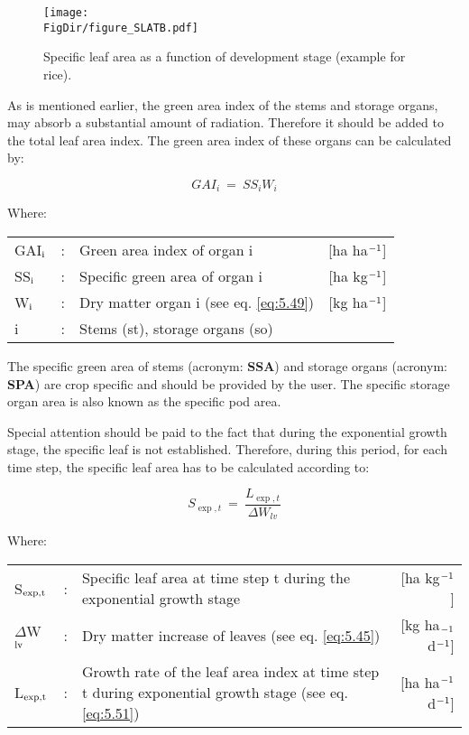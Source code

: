 \begin{figure}[p]
	\centering
	\texttt{[image: \\FigDir/figure\_SLATB.pdf]}
	\caption{Specific leaf area as a function of development stage (example for rice).}
	\label{fig:SpecificLeafArea}
\end{figure}

As is mentioned earlier, the green area index of the stems and storage organs, may absorb
a substantial amount of radiation. Therefore it should be added to the total leaf area
index. The green area index of these organs can be calculated by:

\begin{equation}
GAI_{i} ~=~SS _{i} W _{i} 
\end{equation}

Where:\\[5pt]
\begin{tabularx}{\textwidth}{llXr}
	GAI$_{{\rm i}}$ &:& Green area index of organ i    &
	[ha ha$^{{\rm -1}}$]\\
	SS$_{{\rm i}}$ &:& Specific green area of organ i    &
	[ha kg$^{{\rm -1}}$]\\
	W$_{{\rm i}}$ &:& Dry matter organ i (see eq. \ref{eq:5.49})    &
	[kg ha$^{{\rm -1}}$]\\
	i &:& Stems (st), storage organs (so)
\end{tabularx}

The specific green area of stems (acronym: {\bf SSA}) and storage organs (acronym: {\bf SPA}) are
crop specific and should be provided by the user. The specific storage organ area is also
known as the specific pod area.

Special attention should be paid to the fact that during the exponential growth stage, the
specific leaf is not established. Therefore, during this period, for each time step, the
specific leaf area has to be calculated according to:

\begin{equation}
S_{\exp,t} ~=~ {\frac{L_{\exp,t}}{\Delta W_{lv} }}
\end{equation}

Where:\\[5pt]
\begin{tabularx}{\textwidth}{llXr}
	S$_{{\rm exp,t}}$ &:& Specific leaf area at time step t during the 
	exponential growth stage    &     [ha kg$^{{\rm -1}}$]\\
	$\Delta$W$_{{\rm lv}}$ &:& Dry matter increase of leaves (see eq. \ref{eq:5.45})   &
	[kg ha$_{{\rm -1}}$ d$^{{\rm -1}}$]\\
	L$_{{\rm \exp,t}}$ &:& Growth rate of the leaf area index at time step t
	during exponential growth stage (see eq. \ref{eq:5.51})   &
	[ha ha$^{{\rm -1}}$ d$^{{\rm -1}}$]\\
\end{tabularx}

